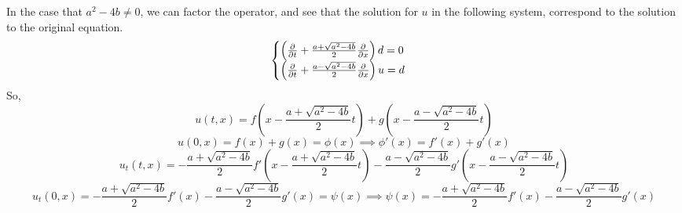 \documentclass{article}
\begin{document}
In the case that $a^2-4b \neq 0$, we can factor the operator, and see
that the solution for $u$ in the following system, correspond to
the solution to the original equation.
\[\begin{cases} \left(\pdv{t} +
      \frac{a + \sqrt{a^2-4b}}{2}\pdv{x} \right)d = 0\\ \left(\pdv{t} + \frac{a -
        \sqrt{a^2-4b}}{2}\pdv{x}  \right)u = d\end{cases}\]
So, \[u(t,x) = f\left(x - \frac{a+\sqrt{a^2-4b}}{2}t \right) + g\left(x -\frac{a -
      \sqrt{a^2-4b}}{2}t\right)\]
\[u(0,x) = f(x)+g(x) = \phi(x)\implies \phi'(x) = f'(x)+g'(x)\]
\[u_t(t,x) = - \frac{a+\sqrt{a^2-4b}}{2}f'\left(x - \frac{a+\sqrt{a^2-4b}}{2}t \right) - \frac{a-\sqrt{a^2-4b}}{2}g'\left(x -\frac{a -
      \sqrt{a^2-4b}}{2}t\right)\]
\[u_t(0,x) = - \frac{a+\sqrt{a^2-4b}}{2}f'\left(x\right) -
  \frac{a-\sqrt{a^2-4b}}{2}g'\left(x\right) = \psi(x) \implies
  \psi(x) = - \frac{a+\sqrt{a^2-4b}}{2}f'\left(x\right) -
  \frac{a-\sqrt{a^2-4b}}{2}g'\left(x\right)\]
\end{document}
